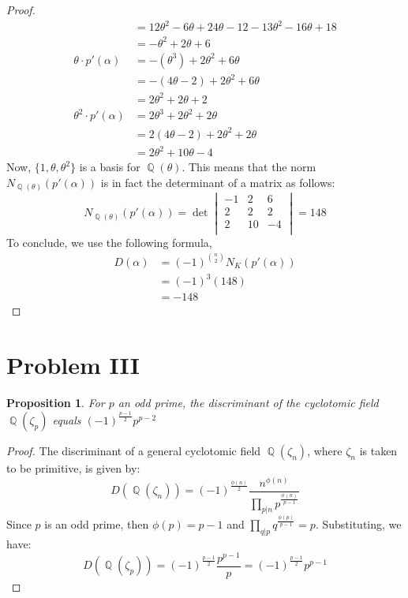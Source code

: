 \documentclass{article}
\newtheorem{proposition}[theorem]{Proposition}
\DeclareMathOperator{\Q}{\mathbb{Q}}
\begin{document}
\begin{proof}
\begin{align*}
	&= 12\theta^2-6\theta+24\theta-12-13\theta^2-16\theta+18\\
	&=-\theta^2+2\theta+6\\
	\theta\cdot p'(\alpha)&=-(\theta^3)+2\theta^2+6\theta\\
	&= -(4\theta-2)+2\theta^2+6\theta\\
	&= 2\theta^2+2\theta+2\\
	\theta^2\cdot p'(\alpha) &= 2\theta^3+2\theta^2+2\theta\\
	&= 2(4\theta-2)+2\theta^2+2\theta\\
	&= 2\theta^2+10\theta-4
	\end{align*}
	Now, $\{1,\theta,\theta^2\}$ is a basis for $\Q(\theta)$.  This means that the norm $N_{\Q(\theta)}(p'(\alpha))$ is in fact the determinant of a matrix as follows:
	$$N_{\Q(\theta)}(p'(\alpha))=\det\begin{vmatrix}
		-1 & 2 & 6\\
		2& 2& 2\\
		2&10&-4\\
	\end{vmatrix} = 148$$
	To conclude, we use the following formula,
	\begin{align*}
	D(\alpha) &= (-1)^{n\choose 2}N_K(p'(\alpha))\\
	&= (-1)^3 (148)\\
	&= -148
	\end{align*}
\end{proof}
\section{Problem III}
\begin{proposition}
	For $p$ an odd prime, the discriminant of the cyclotomic field $\Q(\zeta_p)$ equals $(-1)^{\frac{p-1}{2}}p^{p-2}$
\end{proposition}
\begin{proof}
	The discriminant of a general cyclotomic field $\Q(\zeta_n)$, where $\zeta_n$ is taken to be primitive, is given by: $$D(\Q(\zeta_n)) = (-1)^{\frac{\phi(n)}{2}}\frac{n^{\phi(n)}}{\prod_{p|n}p^{\frac{\phi(n)}{p-1}}}$$Since $p$ is an odd prime, then $\phi(p)=p-1$ and $\prod_{q|p}q^\frac{\phi(p)}{p-1} = p$.  Substituting, we have:
	$$D(\Q(\zeta_p)) = (-1)^{\frac{p-1}{2}}\frac{p^{p-1}}{p}=(-1)^{\frac{p-1}{2}}p^{p-1}$$
\end{proof}
\end{document}
